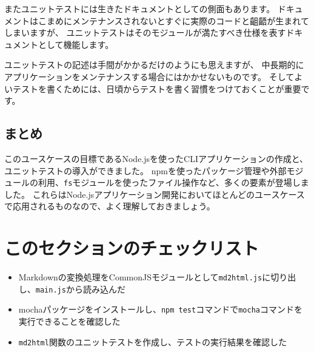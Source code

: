 またユニットテストには生きたドキュメントとしての側面もあります。
ドキュメントはこまめにメンテナンスされないとすぐに実際のコードと齟齬が生まれてしまいますが、
ユニットテストはそのモジュールが満たすべき仕様を表すドキュメントとして機能します。

ユニットテストの記述は手間がかかるだけのようにも思えますが、
中長期的にアプリケーションをメンテナンスする場合にはかかせないものです。
そしてよいテストを書くためには、日頃からテストを書く習慣をつけておくことが重要です。

\hypertarget{unit-test-summary}{%
\subsection{まとめ}\label{unit-test-summary}}

このユースケースの目標であるNode.jsを使ったCLIアプリケーションの作成と、ユニットテストの導入ができました。
npmを使ったパッケージ管理や外部モジュールの利用、\texttt{fs}モジュールを使ったファイル操作など、多くの要素が登場しました。
これらはNode.jsアプリケーション開発においてほとんどのユースケースで応用されるものなので、よく理解しておきましょう。

\hypertarget{section-checklist}{%
\section{このセクションのチェックリスト}\label{section-checklist}}

\begin{itemize}
\item
  Markdownの変換処理をCommonJSモジュールとして\texttt{md2html.js}に切り出し、\texttt{main.js}から読み込んだ
\item
  mochaパッケージをインストールし、\texttt{npm test}コマンドで\texttt{mocha}コマンドを実行できることを確認した
\item
  \texttt{md2html}関数のユニットテストを作成し、テストの実行結果を確認した
\end{itemize}
